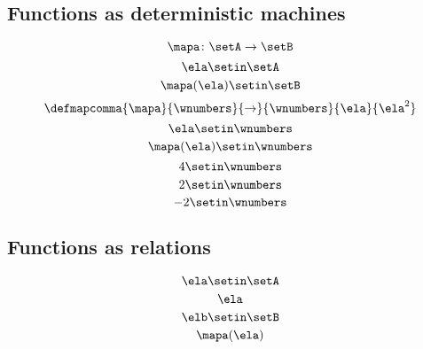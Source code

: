 \begin{forslides}
    \subsection{Functions as deterministic machines}

    \begin{equation}
        \label{eq:slides_session2_94}
        \mapa\colon \setA \to \setB
    \end{equation}
    \begin{equation}
        \label{eq:slides_session2_95}
        \ela \setin\setA
    \end{equation}
    \begin{equation}
        \label{eq:slides_session2_96}
        \mapa(\ela) \setin\setB
    \end{equation}
    \begin{equation}
        \label{eq:slides_session2_97}
        \defmapcomma{\mapa}{\wnumbers}{\to}{\wnumbers}{\ela}{\ela^2}
    \end{equation}
    \begin{equation}
        \label{eq:slides_session2_98}
        \ela \setin\wnumbers
    \end{equation}
    \begin{equation}
        \label{eq:slides_session2_99}
        \mapa(\ela) \setin\wnumbers
    \end{equation}
    \begin{equation}
        \label{eq:slides_session2_100}
        4 \setin\wnumbers
    \end{equation}
    \begin{equation}
        \label{eq:slides_session2_101}
        2 \setin\wnumbers
    \end{equation}
    \begin{equation}
        \label{eq:slides_session2_102}
        -2 \setin\wnumbers
    \end{equation}

    \subsection{Functions as relations}

    \begin{equation}
        \label{eq:slides_session2_103}
        \ela \setin\setA
    \end{equation}
    \begin{equation}
        \label{eq:slides_session2_104}
        \ela
    \end{equation}
    \begin{equation}
        \label{eq:slides_session2_105}
        \elb \setin \setB
    \end{equation}
    \begin{equation}
        \label{eq:slides_session2_106}
        \mapa(\ela)
    \end{equation}


\end{forslides}

